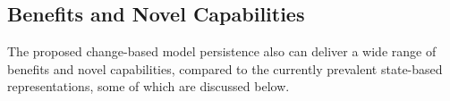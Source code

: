 %
%

\subsection{Benefits and Novel Capabilities}
\label{sec:benefits_and_novel_capabilities}

The proposed change-based model persistence also can deliver a wide range of benefits and novel capabilities, compared to the currently prevalent state-based representations, some of which are discussed below.

